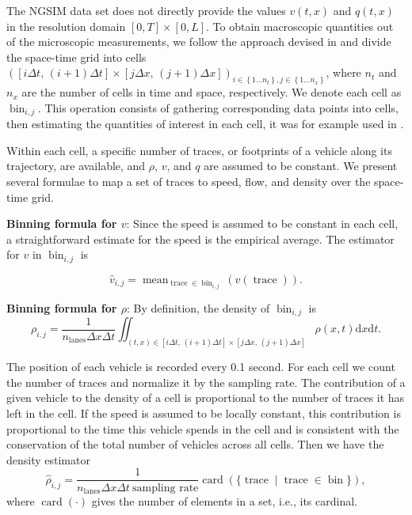 \documentclass[5p,twocolumn]{elsarticle}
\DeclareMathOperator{\card}{card}
\DeclareMathOperator{\trc}{trace}
\DeclareMathOperator{\mean}{mean}
\DeclareMathOperator{\bin}{bin}
\DeclareMathOperator{\lns}{lanes}
\begin{document}
The NGSIM data set does not directly provide the values $v(t,x)$
and $q(t,x)$ in the resolution domain $\left[0,T\right]\times\left[0,L\right]$. To obtain macroscopic quantities out of the microscopic measurements, we follow the approach devised in \cite{edie1963discussion} and divide the space-time grid into cells $\left(\left[i\Delta t,\, \left(i+1\right)\Delta t\right]\times\left[j\Delta x, \, (j+1)\Delta x\right]\right)_{i\in\left\{ 1\ldots n_{t}\right\} ,j\in\left\{ 1\ldots n_{x}\right\} }$, where $n_t$ and $n_x$ are the number of cells in time and space, respectively. We denote each cell as $\bin_{i,j}$. This operation consists of gathering corresponding data points into cells, then estimating the quantities of interest in each cell, it was for example used in \cite{Piccoli201532}.

Within each cell, a specific number of traces, or footprints of a vehicle along its trajectory, are available, and $\rho$, $v$, and $q$ are assumed to be constant. We present several formulae to map a set of traces to speed, flow, and density over the space-time grid. 

\textbf{Binning formula for $v$}: Since the speed is assumed to be constant in each cell, a straightforward estimate for the speed is the empirical average. The estimator for $v$ in $\bin_{i,j}$ is

\begin{equation}
\widehat{v}_{i,j}=\mean_{\trc \in \bin_{i,j}}(v(\trc)).
\end{equation}

\textbf{Binning formula for $\rho$}: By definition, the density of $\bin_{i,j}$ is  
\begin{equation}
\rho_{i,j}=\frac{1}{n_{\lns}\Delta x\Delta t}\iint_{\left(t,x\right)\in [i\Delta t, \,(i+1)\Delta t] \times [j\Delta x,\,(j+1)\Delta x]}\rho(x,t) \text{d}x \text{d}t.
\end{equation}

The position of each vehicle is recorded every 0.1 second. For each cell we count the number of traces and normalize it by the sampling rate. The contribution of a given vehicle to the density of a cell is proportional to the number of traces it has left in the cell. If the speed is assumed to be locally constant, this contribution is proportional to the time this vehicle spends in the cell and is consistent with the conservation of the total number of vehicles across all cells. Then we have the density estimator
\begin{equation}
\widehat{\rho}_{i,j}=\frac{1}{n_{\lns} \Delta x \Delta t \: \text{sampling rate}}\card ( \{ \trc \mid \trc \in \bin \} ),
\end{equation}
where $\card (\cdot)$ gives the number of elements in a set, i.e., its cardinal. 
\end{document}
